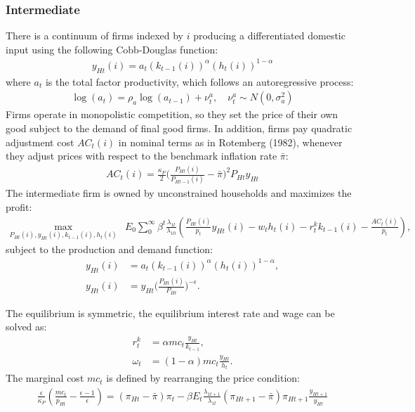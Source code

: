 \documentclass[12pt]{article}
\begin{document}
\subsubsection*{Intermediate}
There is a continuum of firms indexed by $i$ producing a differentiated domestic input using the following Cobb-Douglas function:
\begin{align*}
y_{Ht}(i) = a_t(k_{t-1}(i))^{\alpha}(h_t(i))^{1-\alpha}
\end{align*}
where $a_t$ is the total factor productivity, which follows an autoregressive process: 
\begin{align*}
\log(a_t) = \rho_a\log(a_{t-1})+\nu_t^a, \quad  \nu_t^a \sim N(0,\sigma_a^2)
\end{align*}
Firms operate in monopolistic competition, so they set the price of their own good subject to the demand of final good firms. In addition, firms pay quadratic adjustment cost $AC_t(i)$ in nominal terms as in Rotemberg (1982), whenever they adjust prices with respect to the benchmark inflation rate $\bar{\pi}$:
\begin{align*}
AC_t(i) = \frac{\kappa_P}{2}\Big(\frac{P_{Ht}(i)}{P_{Ht-1}(i)}-\bar{\pi}\Big)^2P_{Ht}y_{Ht}
\end{align*}
The intermediate firm is owned by unconstrained households and maximizes the profit: 
\begin{align*}
\max_{P_{Ht}(i),y_{Ht}(i),k_{t-1}(i), h_t(i)} &E_0 \sum_0^{\infty}\beta^t\frac{\lambda_{1t}}{\lambda_{10}}(\frac{P_{Ht}(i)}{p_t}y_{Ht}(i)-w_th_t(i)-r_t^kk_{t-1}(i)-\frac{AC_t(i)}{p_t}),
\end{align*}
subject to the production and demand function: 
\begin{align*}
y_{Ht}(i) &= a_t(k_{t-1}(i))^{\alpha}(h_t(i))^{1-\alpha}, \\
y_{Ht}(i) &= y_{Ht}\Big(\frac{P_{Ht}(i)}{P_{Ht}}\Big)^{-\epsilon}.
\end{align*}

The equilibrium is symmetric, the equilibrium interest rate and wage can be solved as: 
\begin{align*}
r_t^k &= \alpha mc_t \frac{y_{Ht}}{k_{t-1}}, \\
\omega_t &= (1-\alpha) mc_t \frac{y_{Ht}}{h_t}.
\end{align*}
The marginal cost $mc_t$ is defined by rearranging the price condition: 
\begin{align*}
\frac{\epsilon}{\kappa_P}(\frac{mc_t}{p_{Ht}}-\frac{\epsilon-1}{\epsilon}) = (\pi_{Ht}-\bar{\pi})\pi_t-\beta E_t \frac{\lambda_{1t+1}}{\lambda_{1t}} (\pi_{Ht+1}-\bar{\pi})\pi_{Ht+1}\frac{y_{Ht+1}}{y_{Ht}}
\end{align*}
\end{document}

